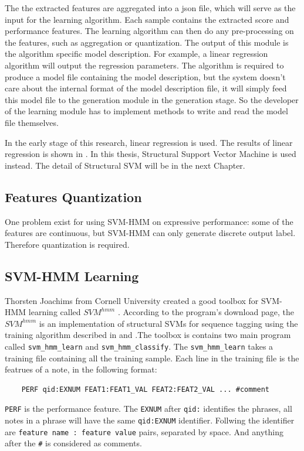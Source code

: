    The the extracted features are aggregated into a json file, which will serve as the input for the learning algorithm. Each sample contains the extracted score and performance features. The learning algorithm can then do any pre-processing on the features, such as aggregation or quantization. The output of this module is the algorithm specific model description. For example, a linear regression algorithm will output the regression parameters. The algorithm is required to produce a model file containing the model description, but the system doesn't care about the internal format of the model description file, it will simply feed this model file to the generation module in the generation stage. So the developer of the learning module has to implement methods to write and read the model file themselves.

   In the early stage of this research, linear regression is used. The results of linear regression is shown in \cite{Lyu2012}. In this thesis, Structural Support Vector Machine\cite{Joachims2009} is used instead. The detail of Structural SVM will be in the next Chapter.

\subsection{Features Quantization}
One problem exist for using SVM-HMM on expressive performance: some of the features are continuous, but SVM-HMM can only generate discrete output label. Therefore quantization is required. 
\subsection{SVM-HMM Learning}
Thorsten Joachims from Cornell University created a good toolbox for SVM-HMM learning called $SVM^{hmm}$ \cite{Joachims2008}. According to the program's download page, the $SVM^{hmm}$ is an implementation of structural SVMs for sequence tagging \cite{TODO:altun2003} using the training algorithm described in \cite{TODO:tsoch2004, 2005} and \cite{TODO:Joachims et al. 2009}.The toolbox is contains two main program called \texttt{svm\_hmm\_learn} and \texttt{svm\_hmm\_classify}. The \texttt{svm\_hmm\_learn} takes a training file containing all the training sample. Each line in the training file is the featrues of a note, in the following format:
\begin{lstlisting}
	PERF qid:EXNUM FEAT1:FEAT1_VAL FEAT2:FEAT2_VAL ... #comment
\end{lstlisting}
\texttt{PERF} is the performance feature. The \texttt{EXNUM} after \texttt{qid:} identifies the phrases, all notes in a phrase will have the same \texttt{qid:EXNUM} identifier. Follwing the identifier are \texttt{feature name : feature value} pairs, separated by space. And anything after the \texttt{\#} is considered as comments.

